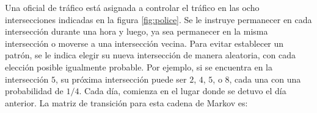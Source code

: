 \begin{example}\label{exam:markov5}
    Una oficial de tráfico está asignada a controlar el tráfico en las ocho intersecciones indicadas en la figura \ref{fig:police}. Se le instruye permanecer en cada intersección durante una hora y luego, ya sea permanecer en la misma intersección o moverse a una intersección vecina. Para evitar establecer un patrón, se le indica elegir su nueva intersección de manera aleatoria, con cada elección posible igualmente probable. Por ejemplo, si se encuentra en la intersección $5$, su próxima intersección puede ser $2$, $4$, $5$, o $8$, cada una con una probabilidad de $1/4$. Cada día, comienza en el lugar donde se detuvo el día anterior. La matriz de transición para esta cadena de Markov es:\\
    \begin{nscenter}
\end{nscenter}
\end{example}
